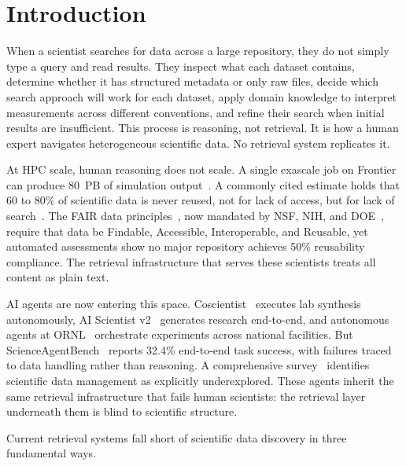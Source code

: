 \section{Introduction}

When a scientist searches for data across a large repository, they do not simply type a query and read results. They inspect what each dataset contains, determine whether it has structured metadata or only raw files, decide which search approach will work for each dataset, apply domain knowledge to interpret measurements across different conventions, and refine their search when initial results are insufficient. This process is reasoning, not retrieval. It is how a human expert navigates heterogeneous scientific data. No retrieval system replicates it.

At HPC scale, human reasoning does not scale. A single exascale job on Frontier can produce 80~PB of simulation output~\cite{george2025lustre}. A commonly cited estimate holds that 60 to 80\% of scientific data is never reused, not for lack of access, but for lack of search~\cite{baker2016reproducibility}. The FAIR data principles~\cite{wilkinson2016fair}, now mandated by NSF, NIH, and DOE~\cite{nih_dmsp2023}, require that data be Findable, Accessible, Interoperable, and Reusable, yet automated assessments show no major repository achieves 50\% reusability compliance. The retrieval infrastructure that serves these scientists treats all content as plain text.

AI agents are now entering this space. Coscientist~\cite{coscientist2023} executes lab synthesis autonomously, AI Scientist v2~\cite{aiscientistv2_2025} generates research end-to-end, and autonomous agents at ORNL~\cite{ornl_agents_sc25} orchestrate experiments across national facilities. But ScienceAgentBench~\cite{scienceagentbench2025} reports 32.4\% end-to-end task success, with failures traced to data handling rather than reasoning. A comprehensive survey~\cite{agentic_ai_survey2025} identifies scientific data management as explicitly underexplored. These agents inherit the same retrieval infrastructure that fails human scientists: the retrieval layer underneath them is blind to scientific structure.

Current retrieval systems fall short of scientific data discovery in three fundamental ways.

